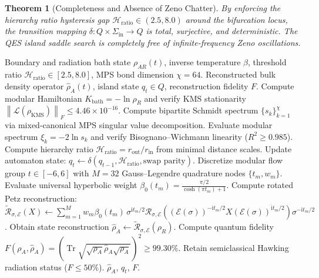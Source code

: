 \documentclass[11pt,a4paper]{article}
\theoremstyle{plain}
\newtheorem{theorem}{Theorem}[section]
\theoremstyle{definition}
\DeclareMathOperator{\Tr}{Tr}
\newcommand{\KMS}{\mathrm{KMS}}
\newcommand{\norm}[1]{\left\lVert #1 \right\rVert}
\begin{document}
\begin{theorem}[Completeness and Absence of Zeno Chatter]
By enforcing the hierarchy ratio hysteresis gap $\mathcal{H}_{\mathrm{ratio}} \in (2.5, 8.0)$ around the bifurcation locus, the transition mapping $\delta: Q \times \Sigma_{\mathrm{in}} \to Q$ is total, surjective, and deterministic. The QES island saddle search is completely free of infinite-frequency Zeno oscillations.
\end{theorem}

\begin{algorithm}[htbp]
\caption{Hysteresis-Stabilized QES Island Detection and Universal Rotated Petz Inversion}
\label{alg:qes_rotated_petz}
\begin{algorithmic}[1]
\Require Boundary and radiation bath state $\rho_{AR}(t)$, inverse temperature $\beta$, threshold ratio $\mathcal{H}_{\mathrm{ratio}} \in [2.5, 8.0]$, MPS bond dimension $\chi = 64$.
\Ensure Reconstructed bulk density operator $\hat{\rho}_A(t)$, island state $q_t \in Q$, reconstruction fidelity $F$.
\State Compute modular Hamiltonian $K_{\mathrm{bath}} = -\ln \rho_R$ and verify KMS stationarity $\norm{\mathcal{L}(\rho_{\KMS})}_F \le 4.46 \times 10^{-16}$.
\State Compute bipartite Schmidt spectrum $\{s_k\}_{k=1}^\chi$ via mixed-canonical MPS singular value decomposition.
\State Evaluate modular spectrum $\xi_k = -2\ln s_k$ and verify Bisognano--Wichmann linearity ($R^2 \ge 0.985$).
\State Compute hierarchy ratio $\mathcal{H}_{\mathrm{ratio}} = r_{\mathrm{out}} / r_{\mathrm{in}}$ from minimal distance scales.
\State Update automaton state: $q_t \leftarrow \delta(q_{t-1}, \mathcal{H}_{\mathrm{ratio}}, \text{swap parity})$.
 
    \State Discretize modular flow group $t \in [-6, 6]$ with $M = 32$ Gauss--Legendre quadrature nodes $\{t_m, w_m\}$.
    \State Evaluate universal hyperbolic weight $\beta_0(t_m) = \frac{\pi/2}{\cosh(\pi t_m) + 1}$.
    \State Compute rotated Petz reconstruction:
    \Statex \qquad $\widetilde{\mathcal{R}}_{\sigma, \mathcal{E}}(X) \leftarrow \sum_{m=1}^M w_m \beta_0(t_m) \, \sigma^{\mathrm{i}t_m/2} \mathcal{R}_{\sigma, \mathcal{E}}\left( (\mathcal{E}(\sigma))^{-\mathrm{i}t_m/2} X (\mathcal{E}(\sigma))^{\mathrm{i}t_m/2} \right) \sigma^{-\mathrm{i}t_m/2}$.
    \State Obtain state reconstruction $\hat{\rho}_A \leftarrow \widetilde{\mathcal{R}}_{\sigma, \mathcal{E}}(\rho_R)$.
    \State Compute quantum fidelity $F(\rho_A, \hat{\rho}_A) = \left( \Tr\sqrt{\sqrt{\rho_A}\hat{\rho}_A\sqrt{\rho_A}} \right)^2 \ge 99.30\%$.
\Else {}
    \State Retain semiclassical Hawking radiation status ($F \le 50\%$).
\EndIf
\State \Return $\hat{\rho}_A$, $q_t$, $F$.
\end{algorithmic}
\end{algorithm}
\end{document}
